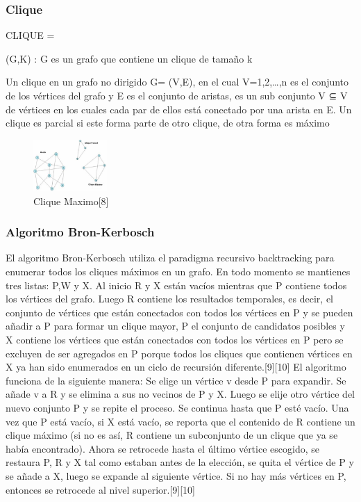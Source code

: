 \documentclass[conference,compsoc]{IEEEtran}
\begin{document}
\subsubsection{Clique}
CLIQUE = {(G,K) : G es un grafo que contiene un clique  de tamaño k

Un clique en un grafo no dirigido G= (V,E), en el cual V={1,2,…,n} es el conjunto de los vértices del grafo y E es el conjunto de aristas, es un sub conjunto V ⊆ V de vértices en los cuales cada par de ellos está conectado por una arista en E. Un clique es parcial si este forma parte de otro clique, de otra forma es máximo
\begin{figure}[h]
    \centering
    \includegraphics[width=0.25\textwidth]{Problema3/M5.png}
    \caption{Clique Maximo[8]}
    \label{fig:mesh1}
\end{figure}

\subsubsection{Algoritmo Bron-Kerbosch}
El algoritmo Bron-Kerbosch utiliza el paradigma recursivo backtracking para enumerar todos los cliques máximos en un grafo. En todo momento se mantienes tres listas: P,W y X. Al inicio R y X están vacíos mientras que P contiene todos los vértices del grafo. Luego R contiene los resultados temporales, es decir, el conjunto de vértices que están conectados con todos los vértices en P y se pueden añadir a P para formar un clique mayor, P el conjunto de candidatos posibles y  X contiene los vértices que están conectados con todos los vértices en P pero se excluyen de ser agregados en P porque todos los cliques que contienen vértices en X ya han sido enumerados en un ciclo de recursión diferente.[9][10]
El algoritmo funciona de la siguiente manera:
Se elige un vértice v desde P para expandir. Se añade v a R y se elimina a sus no vecinos de P y X. Luego se elije otro vértice del nuevo conjunto P y se repite el proceso. Se continua hasta que P esté vacío. Una vez que P está vacío, si X está vacío, se reporta que el contenido de R contiene un clique máximo (si no es así, R contiene un subconjunto de un clique que ya se había encontrado). Ahora se retrocede hasta el último vértice escogido, se restaura P, R y X tal como estaban antes de la elección, se quita el vértice de P y se añade a X, luego se expande al siguiente vértice. Si no hay más vértices en P, entonces se retrocede al nivel superior.[9][10]


}
\end{document}
